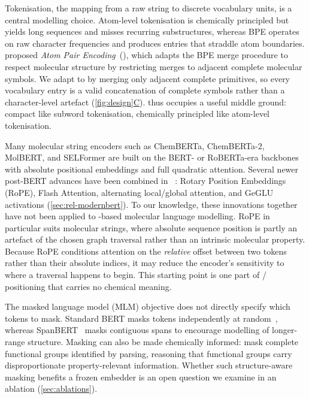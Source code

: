 \documentclass[11pt,a4paper]{article}
\begin{document}
Tokenisation, the mapping from a raw string to discrete vocabulary units, is a central modelling choice.
Atom-level tokenisation is chemically principled but
yields long sequences and misses recurring substructures, whereas BPE operates
on raw character frequencies and produces entries that straddle atom boundaries.
\citet{leonComparingSMILESSELFIES2024} proposed \emph{Atom Pair Encoding}~(\ape{}),
which adapts the BPE merge procedure to respect molecular structure by
restricting merges to adjacent complete molecular symbols. We adapt \ape{} to
\selfies{} by merging only adjacent complete \selfies{} primitives, so every
vocabulary entry is a valid concatenation of complete \selfies{} symbols rather
than a character-level artefact (\hyperref[fig:design]{\cref*{fig:design}C}). \ape{} thus occupies a useful
middle ground: compact like subword tokenisation, chemically principled like
atom-level tokenisation.

Many molecular string encoders such as ChemBERTa, ChemBERTa-2, MolBERT,
and SELFormer are built on the BERT- or RoBERTa-era
backbones~\citep{devlinBERTPreTrainingDeep2019,liuRoBERTaRobustlyOptimized}
with absolute positional embeddings and full quadratic attention.
Several newer post-BERT advances have been combined in \modernbert{}~\citep{warnerSmarterBetterFaster2024}: Rotary Position Embeddings (RoPE), Flash Attention, alternating
local/global attention, and GeGLU activations (\cref{sec:rel-modernbert}). To our knowledge, these innovations together
have not been applied to \selfies{}-based molecular language modelling.
RoPE in particular suits molecular strings, where absolute sequence
position is partly an artefact of the chosen graph traversal rather than an
intrinsic molecular property. Because RoPE conditions attention on the
\emph{relative} offset between two tokens rather than their absolute indices,
it may reduce the encoder's sensitivity to where a traversal happens to begin. This starting point is one part of \smiles{}/\selfies{} positioning that carries no
chemical meaning.

The masked language model (MLM) objective does not directly specify which tokens to mask. Standard BERT masks tokens
independently at random~\citep{devlinBERTPreTrainingDeep2019}, whereas
SpanBERT~\citep{joshiSpanBERTImprovingPreTraining2020} masks contiguous spans
to encourage modelling of longer-range structure. Masking can also be made
chemically informed: \citet{pengPretrainedMolecularLanguage2025} mask complete
functional groups identified by parsing, reasoning that functional groups
carry disproportionate property-relevant information. Whether such
structure-aware masking benefits a frozen \selfies{} embedder is an open
question we examine in an ablation (\cref{sec:ablations}).
\end{document}
